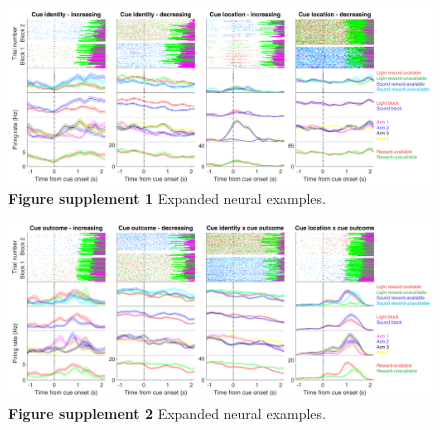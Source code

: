 \documentclass[11pt]{article}
\newcommand{\bsf}[1]{\textbf{#1}}
\begin{document}
 \begin{figure}[ht!]
\centering
\includegraphics[width=\textwidth]{Fig 4 - Neural examples SUPP1.pdf}
\caption*{\bsf{Figure supplement 1} Expanded neural examples.}
\label{fig:examplesSUPP1}
\end{figure} \clearpage

 \begin{figure}[ht!]
\centering
\includegraphics[width=\textwidth]{Fig 4 - Neural examples SUPP2.pdf}
\caption*{\bsf{Figure supplement 2} Expanded neural examples.}
\label{fig:examplesSUPP2}
\end{figure} \clearpage
\end{document}
